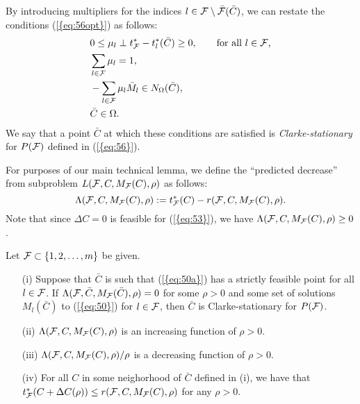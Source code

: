 \documentclass{siamltex}
\begin{document}
By introducing multipliers for the indices $l \in {{\cal F}} \setminus
\bar{{\cal F}} (\bar{C})$, we can restate the conditions {(\ref{{eq:56opt}})}
as follows:
\begin{subequations}
\label{eq:56opta}
\begin{align} 
&0 \le \mu_l \perp  t^*_{{\cal F}} - t^*_l(\bar{C}) \ge 0, 
\qquad \mbox{for all $l \in {{\cal F}}$,} \\
&\sum_{l \in {{\cal F}}} \mu_l =1, \\
&-\sum_{l \in {{\cal F}}} \mu_l \bar{M}_l \in  N_{\Omega}(\bar{C}), \\
&\bar{C} \in \Omega.
\end{align}
\end{subequations}
We say that a point $\bar{C}$ at which these conditions are satisfied
is {\em Clarke-stationary} for $P({{\cal F}})$ defined in {(\ref{{eq:56}})}.

For purposes of our main technical lemma, we define the ``predicted
decrease'' from subproblem $L({{\cal F}},C,M_{{\cal F}}(C),\rho)$ as follows:
\begin{equation} \label{eq:Lam}
\Lambda({{\cal F}},C,M_{{\cal F}}(C),\rho) := t^*_{{\cal F}}(C) - r({{\cal F}},C,M_{{\cal F}}(C),\rho).
\end{equation}
Note that since ${\Delta C}=0$ is feasible for 
{(\ref{{eq:53}})}, we have $\Lambda({{\cal F}},C,M_{{\cal F}}(C),\rho) \ge 0$.

\begin{lemma} \label{lem:tech}
Let ${{\cal F}} \subset \{1,2,\dotsc,m\}$ be given.
\begin{itemize}
\item[(i)] Suppose that $\bar{C}$ is such that  {(\ref{{eq:50a}})}
  has a strictly feasible point for all $l \in {{\cal F}}$.
  If $\Lambda({{\cal F}},\bar{C},M_{{\cal F}}(\bar{C}),\rho)=0$ for some $\rho>0$
  and some set of solutions $M_l(\bar{C})$ to {(\ref{{eq:50}})} for $l \in
  {{\cal F}}$, then $\bar{C}$ is Clarke-stationary for $P({{\cal F}})$.
\item[(ii)] $\Lambda({{\cal F}},C,M_{{\cal F}}(C),\rho)$ is an increasing function
  of $\rho>0$.
\item[(iii)] $\Lambda({{\cal F}},C,M_{{\cal F}}(C),\rho) / \rho$ is a decreasing
  function of $\rho>0$.
\item[(iv)] For all $C$ in some neighorhood of $\bar{C}$ defined in
  (i), we have that $t^*_{{\cal F}}(C + {\Delta C}(\rho)) \le
  r({{\cal F}},C,M_{{\cal F}}(C),\rho)$ for any $\rho>0$.
\end{itemize}

\end{lemma}
\end{document}
